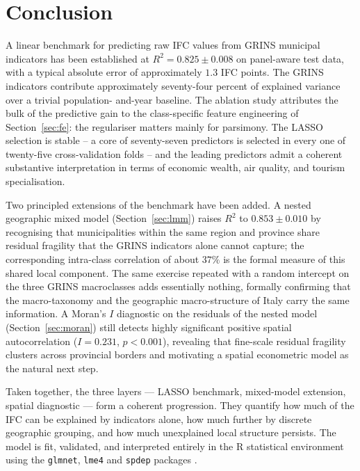 \documentclass[11pt,a4paper]{article}
\begin{document}
\section{Conclusion}
\label{sec:conclusion}

A linear benchmark for predicting raw IFC values from GRINS municipal
indicators has been established at \(R^{2} = 0.825 \pm 0.008\) on
panel-aware test data, with a typical absolute error of approximately
\(1.3\) IFC points. The GRINS indicators contribute approximately
seventy-four percent of explained variance over a trivial population-
and-year baseline. The ablation study attributes the bulk of the
predictive gain to the class-specific feature engineering of
Section~\ref{sec:fe}: the regulariser matters mainly for parsimony.
The LASSO selection is stable -- a core of seventy-seven predictors is
selected in every one of twenty-five cross-validation folds -- and the
leading predictors admit a coherent substantive interpretation in
terms of economic wealth, air quality, and tourism specialisation.

Two principled extensions of the benchmark have been added. A nested
geographic mixed model (Section~\ref{sec:lmm}) raises \(R^{2}\) to
\(0.853 \pm 0.010\) by recognising that municipalities within the
same region and province share residual fragility that the GRINS
indicators alone cannot capture; the corresponding intra-class
correlation of about \(37\%\) is the formal measure of this shared
local component. The same exercise repeated with a random intercept
on the three GRINS macroclasses adds essentially nothing, formally
confirming that the macro-taxonomy and the geographic macro-structure
of Italy carry the same information. A Moran's \(I\) diagnostic on
the residuals of the nested model (Section~\ref{sec:moran}) still
detects highly significant positive spatial autocorrelation
(\(I = 0.231\), \(p < 0.001\)), revealing that fine-scale residual
fragility clusters across provincial borders and motivating a
spatial econometric model as the natural next step.

Taken together, the three layers --- LASSO benchmark, mixed-model
extension, spatial diagnostic --- form a coherent progression. They
quantify how much of the IFC can be explained by indicators alone,
how much further by discrete geographic grouping, and how much
unexplained local structure persists. The model is fit, validated,
and interpreted entirely in the \textsf{R} statistical environment
using the \texttt{glmnet}, \texttt{lme4} and \texttt{spdep} packages
\citep{friedman2010glmnet,bates2015lme4,bivand2018spdep}.
\end{document}
